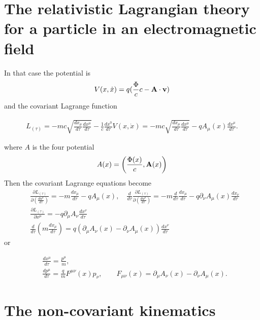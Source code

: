 \section{The relativistic Lagrangian theory for a particle in an electromagnetic field}

In that case the potential is
\begin{align}
  V(x, \dot x) = q(\frac{\Phi}c c -{\bf A} \cdot {\bf v})
\end{align}
and the covariant Lagrange function
\begin{importantbox}
  \begin{align}
    L_{(\tau)}= -mc\sqrt{\frac{dx_{\mu}}{d\tau}\frac{dx^{\mu}}{d\tau}}
    - \frac 1c \frac{dx^0}{d\tau} V(x, \dot x)
    = -mc\sqrt{\frac{dx_{\mu}}{d\tau}\frac{dx^{\mu}}{d\tau}}
    -q A_\mu(x)\frac{dx^{\mu}}{d\tau}.
  \end{align}
\end{importantbox}
where $A$ is the four potential
\begin{align}
  A(x) = \left(\frac{\Phi(x)}{c},{\bf A}(x)\right)
\end{align}
Then the covariant Lagrange equations become
\begin{align}
  &\frac{\partial L_{(\tau)}}{\partial\left(\frac{du^{\mu}}{d\tau}\right)}=-m\frac{dx_{\mu}}{d\tau}-qA_\mu(x),\quad \frac{d}{d\tau}\frac{\partial L_{(\tau)}}{\partial\left(\frac{du^{\mu}}{d\tau}\right)}= -m\frac{d}{d\tau}\frac{dx_{\mu}}{d\tau}-q\partial_\nu A_\mu(x) \frac{dx_{\nu}}{d\tau}\\
  &\frac{\partial L_{(\tau)}}{\partial x^\mu}=-q\partial_\mu A_\nu \frac{dx^{\nu}}{d\tau}\\
  &{\frac{d}{d\tau} (m\frac{dx_{\mu}}{d\tau}) = q\left(\partial_\mu A_\nu(x) - \partial_\nu A_\mu(x)\right)\frac{dx^\nu}{d\tau}}
\end{align}
or
\begin{highlightbox}[title={Covariant equations of motion}]
  \begin{align}
    & \frac{dx^{\mu}}{d\tau} = \frac{p^{\mu}}m, \label{eq1}\\
    & \frac{dp^\mu}{d\tau} = \frac{q}{m} F^{\mu\nu}(x)p_\nu,\qquad
    F_{\mu\nu}(x)=\partial_\mu A_\nu(x) - \partial_\nu A_\mu(x). \label{eq2}
  \end{align}
\end{highlightbox}

\section{The non-covariant kinematics}

